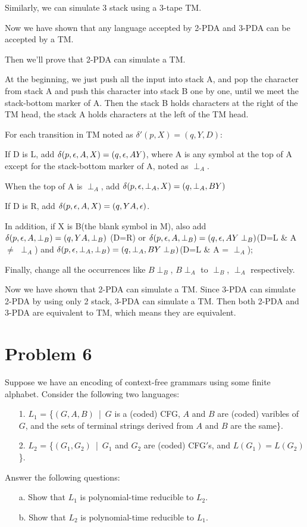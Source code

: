 \documentclass[a4paper,UTF8]{ctexart}
\theoremstyle{definition}
\begin{document}
Similarly, we can simulate 3 stack using a 3-tape TM.

Now we have shown that any language accepted by 2-PDA and 3-PDA can be accepted by a TM.

Then we'll prove that 2-PDA can simulate a TM.

At the beginning,
we just push all the input into stack A, and pop the character from stack A and push this character into stack B
one by one, until we meet the stack-bottom marker of A. Then the stack B holds characters at the right 
of the TM head, the stack A holds characters at the left of the TM head.

For each transition in TM noted as $\delta'(p,X)=(q,Y,D)$: 

If D is L, add $\delta(p,\epsilon, A, X)=(q,\epsilon,AY)$, where A is any symbol at the top of A except 
for the stack-bottom marker of A, noted as $\perp_A$.

When the top of A is $\perp_A$, add $\delta(p,\epsilon,\perp_A, X)=(q,\perp_A,BY)$

If D is R, add $\delta(p,\epsilon, A, X)=(q,YA,\epsilon)$.

In addition, if X is B(the blank symbol in M), also add $\delta(p,\epsilon, A, \perp_B)=(q,YA,\perp_B)$ (D=R)
or $\delta(p,\epsilon,A, \perp_B)=(q,\epsilon,AY\perp_B)$(D=L \& A $\neq$ $\perp_A$) and 
$\delta(p,\epsilon,\perp_A, \perp_B)=(q,\perp_A,BY\perp_B)$(D=L \& A = $\perp_A$); 

Finally, change all the occurrences like $B\perp_B$, $B\perp_A$ to $\perp_B$, $\perp_A$ respectively.

Now we have shown that 2-PDA can simulate a TM. Since 3-PDA can simulate 2-PDA by using only 2 stack,
3-PDA can simulate a TM. Then both 2-PDA and 3-PDA are equivalent to TM, which means they are equivalent.



\section*{Problem 6}
Suppose we have an encoding of context-free grammars using some finite alphabet. Consider the following two languages:
\begin{enumerate}
  \item[1.] $L_1$ = \big\{$(G,A,B)$\ |\ $G$ is a (coded) CFG, $A$ and $B$ are (coded) varibles of $G$, and the sets of terminal strings derived from $A$ and $B$ are the same\big\}.
  \item[2.] $L_2$ = \big\{$(G_1,G_2)$\ |\ $G_1$ and $G_2$ are (coded) CFG$'$s, and $L(G_1) = L(G_2)$\big\}.
\end{enumerate}
Answer the following questions:
\begin{enumerate}
  \item[a.] Show that $L_1$ is polynomial-time reducible to $L_2$.
  \item[b.] Show that $L_2$ is polynomial-time reducible to $L_1$.
\end{enumerate}
\end{document}
